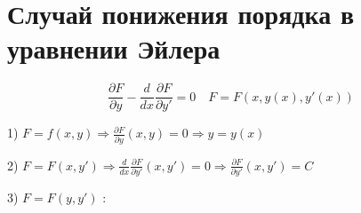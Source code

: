\documentclass[12pt, a4paper]{report}
\begin{document}
\section{Случай понижения порядка в уравнении Эйлера}   

\[ \frac{\partial F}{\partial y} - \frac{d}{d x }  \frac{\partial F}{\partial y'} = 0 \quad  F=F(x,y(x),y'(x))  \] 

1) \(\displaystyle  F= f(x,y) \Rightarrow \frac{\partial F }{\partial y} (x,y) =0 \Rightarrow y= y(x)    \) 

2) \( \displaystyle F= F (x, y ') \Rightarrow \frac{d}{dx }  \frac{\partial F }{\partial y'} (x,y') =0 \Rightarrow \frac{\partial F }{\partial y'} (x,y') = C    \) 


3) \( F= F( y , y ') \) :

\ifdefined\mainfile
\else
    
\end{document}
